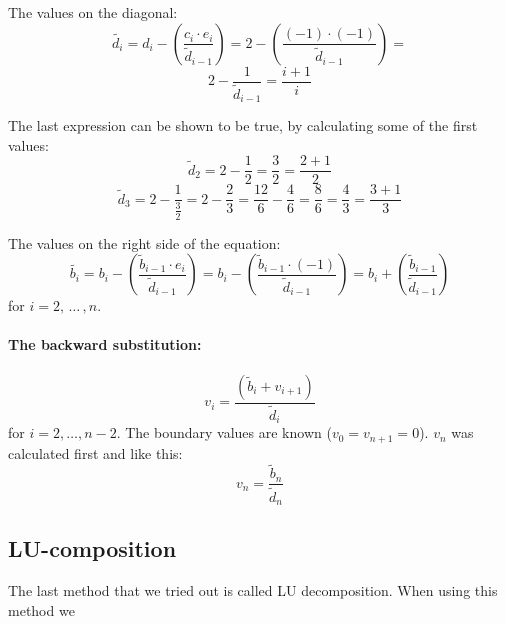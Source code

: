 \hspace{1cm}\linebreak
The values on the diagonal:
\[
\tilde{d_i} =  d_i - \left(\frac{c_i \cdot e_i}{\tilde{d}_{i-1}}\right) = 2 - \left(\frac{(-1) \cdot (-1)}{\tilde{d}_{i-1}}\right) = 
\]
\[
2 - \frac{1}{\tilde{d}_{i-1}} =  \frac{i + 1}{i}
\]

The last expression can be shown to be true, by calculating some of the first values:
\[
\tilde{d}_2 = 2 - \frac{1}{2} = \frac{3}{2} = \frac{2 + 1}{2}
\]
\[
\tilde{d}_3 = 2 - \frac{1}{\frac{3}{2}} = 2 - \frac{2}{3} = \frac{12}{6} - \frac{4}{6} = \frac{8}{6} = \frac{4}{3} = \frac{3+1}{3}
\]

The values on the right side of the equation:
\[
\tilde{b_i} =  b_i - \left(\frac{\tilde{b}_{i-1} \cdot e_i}{\tilde{d}_{i-1}}\right) = b_i - \left(\frac{\tilde{b}_{i-1} \cdot (-1)}{\tilde{d}_{i-1}}\right) = b_i + \left(\frac{\tilde{b}_{i-1}}{\tilde{d}_{i-1}}\right)
\]
for $i = 2,\, \dots\, , n $.

\paragraph{The backward substitution:\hspace{4cm}}

\hspace{1cm}\linebreak
\[
v_i = \frac{\left(\tilde{b}_i + v_{i+1}\right)}{\tilde{d}_i}
\]
for $i = 2, \dots, n-2 $. The boundary values are known ($v_0 = v_{n+1} = 0$). $v_{n}$ was calculated first and like this:
\[
v_{n} = \frac{\tilde{b}_{n}}{\tilde{d}_{n}}
\]

\subsection{LU-composition}

The last method that we tried out is called LU decomposition. When using this method we 